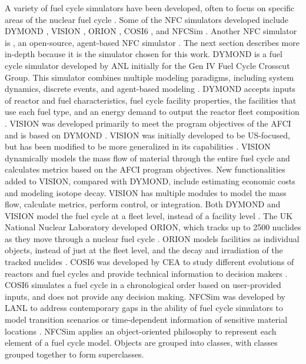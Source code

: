 A variety of fuel cycle simulators have been developed, often to focus on 
specific areas of the nuclear fuel cycle \cite{huff_next_2010}. Some of the 
\gls{NFC} simulators developed include
\gls{DYMOND} \cite{feng_sensitivity_2020,feng_standardized_2016}, 
\gls{VISION} \cite{yacout_visionverifiable_2006}, ORION 
\cite{gregg_analysis_2012}, COSI6 \cite{coquelet-pascal_cosi6:_2015}, and
\gls{NFCSim} \cite{schneider_nfcsim:_2005}.
Another \gls{NFC} simulator is \Cyclus, an open-source, agent-based 
\gls{NFC} simulator \cite{huff_fundamental_2016}. The next section 
describes \Cyclus more in-depth because it is the simulator chosen for this 
work. 
\gls{DYMOND} is a fuel cycle simulator developed by \gls{ANL} initially for 
the Gen IV Fuel Cycle Crosscut Group. This simulator combines 
multiple modeling paradigms, including system dynamics, discrete events, and
agent-based modeling \cite{feng_standardized_2016,feng_sensitivity_2020}.
\gls{DYMOND} accepts inputs of reactor and fuel characteristics, fuel cycle 
facility properties, the facilities that use each fuel type, and an 
energy demand to output the reactor fleet composition \cite{feng_standardized_2016}.
\gls{VISION} was developed primarily to meet the program objectives of the 
\gls{AFCI} and is based on \gls{DYMOND} \cite{yacout_visionverifiable_2006}.
\gls{VISION} was initially developed to be US-focused, but has been modified to 
be more generalized in its capabilities \cite{feng_standardized_2016}.
\gls{VISION} dynamically models the mass flow of material through the 
entire fuel cycle and calculates metrics based on the \gls{AFCI} program 
objectives. New functionalities added to \gls{VISION}, compared with \gls{DYMOND}, 
include estimating economic costs and modeling isotope decay. 
\gls{VISION} has multiple 
modules to model the mass flow, calculate metrics, perform control, or 
integration. 
Both \gls{DYMOND} and \gls{VISION} model the fuel cycle at a fleet level, 
instead of a facility level \cite{feng_standardized_2016}.  
The UK National Nuclear Laboratory developed ORION, which tracks up to 
2500 nuclides as they 
move through a nuclear fuel cycle \cite{gregg_analysis_2012}. ORION models
facilities as individual objects, instead of just at the fleet level, and 
the decay and irradiation of the tracked nuclides 
\cite{feng_standardized_2016}. COSI6 was developed by \gls{CEA} to 
study different evolutions of reactors and fuel cycles and 
provide technical information to decision makers \cite{coquelet-pascal_cosi6:_2015}. 
COSI6 simulates a fuel 
cycle in a chronological order based on user-provided inputs, and does 
not provide any decision making. \gls{NFCSim} was developed by \gls{LANL}
to address contemporary gaps in the ability of fuel cycle simulators 
to model transition scenarios or time-dependent information of 
sensitive material locations \cite{schneider_nfcsim:_2005}. 
\gls{NFCSim} applies an object-oriented 
philosophy to represent each element of a fuel cycle model. Objects 
are grouped into classes, with classes grouped together to form 
superclasses. 

